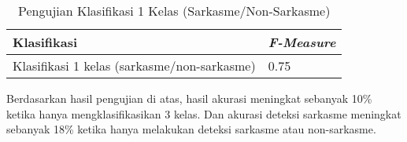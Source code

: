 \begin{table}[h]
	\caption{Pengujian Klasifikasi 1 Kelas (Sarkasme/Non-Sarkasme)}
	\centering
	\small
	\begin{adjustbox}{width=1\textwidth}
	\begin{tabular}{|p{8cm}|p{4.8cm}|}
		\hline
		\textbf{Klasifikasi} & \textit{\textbf{F-Measure}} \\
		\hline
		Klasifikasi 1 kelas (sarkasme/non-sarkasme) & 0.75 \\
		\hline
	\end{tabular}
	\end{adjustbox}
\end{table}
Berdasarkan hasil pengujian di atas, hasil akurasi meningkat sebanyak 10\% ketika hanya mengklasifikasikan 3 kelas. Dan akurasi deteksi sarkasme meningkat sebanyak 18\% ketika hanya melakukan deteksi sarkasme atau non-sarkasme.
\newpage
